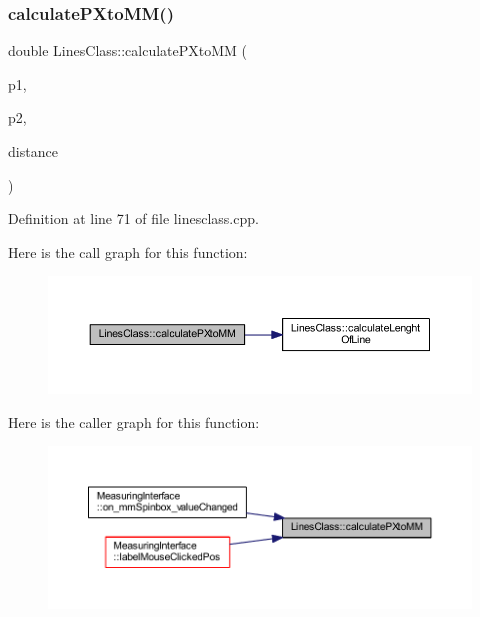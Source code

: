 \subsubsection{\texorpdfstring{calculatePXtoMM()}{calculatePXtoMM()}}
{\footnotesize\ttfamily double Lines\+Class\+::calculate\+P\+Xto\+MM (\begin{DoxyParamCaption}\item[{const Q\+Point}]{p1,  }\item[{const Q\+Point}]{p2,  }\item[{int}]{distance }\end{DoxyParamCaption})\hspace{0.3cm}{\ttfamily [static]}}



Definition at line 71 of file linesclass.\+cpp.

Here is the call graph for this function\+:
\nopagebreak
\begin{figure}[H]
\begin{center}
\leavevmode
\includegraphics[width=350pt]{classLinesClass_a7b00d7bf8c4c9b96d643c2299c52ea62_cgraph}
\end{center}
\end{figure}
Here is the caller graph for this function\+:
\nopagebreak
\begin{figure}[H]
\begin{center}
\leavevmode
\includegraphics[width=350pt]{classLinesClass_a7b00d7bf8c4c9b96d643c2299c52ea62_icgraph}
\end{center}
\end{figure}
\mbox{\label{classLinesClass_a1b656266d53d9364c9969514efd2c878}} 
